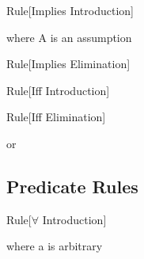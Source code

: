 \begin{namedthm}{Rule}[Implies Introduction]

\begin{bprooftree}
\end{bprooftree}\qquad where A is an assumption

\end{namedthm}

\begin{namedthm}{Rule}[Implies Elimination]

\begin{bprooftree}
\end{bprooftree}\qquad 

\end{namedthm}

\begin{namedthm}{Rule}[Iff Introduction]

\begin{bprooftree}
\end{bprooftree}\qquad 

\end{namedthm}

\begin{namedthm}{Rule}[Iff Elimination]

\begin{bprooftree}
\end{bprooftree}\qquad or \qquad
\begin{bprooftree}
\end{bprooftree}

\end{namedthm}


\subsection{Predicate Rules}
\label{appendix:nd-pred}

\begin{namedthm}{Rule}[$\forall$ Introduction]

\begin{bprooftree}
\end{bprooftree}\qquad where a is arbitrary \qquad

\end{namedthm}

